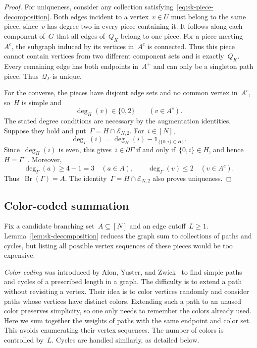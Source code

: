 \documentclass[letterpaper,11pt,reqno]{amsart}
\renewcommand{\leq}{\leqslant}
\renewcommand{\geq}{\geqslant}
\newcommand{\ind}{\mathds{1}}
\DeclareMathOperator{\Br}{Br}
\begin{document}
\begin{proof}
For uniqueness, consider any collection satisfying~\eqref{eq:sk-piece-decomposition}. Both edges incident to a vertex~$v\in U$ must belong to the same piece, since~$v$ has degree two in every piece containing it. It follows along each component of~$G$ that all edges of~$Q_K$ belong to one piece. For a piece meeting~$A^c$, the subgraph induced by its vertices in~$A^c$ is connected. Thus this piece cannot contain vertices from two different component sets and is exactly~$Q_K$. Every remaining edge has both endpoints in~$A^+$ and can only be a singleton path piece. Thus~$\mathcal Q_\Gamma$ is unique.

For the converse, the pieces have disjoint edge sets and no common vertex in~$A^c$, so~$H$ is simple and
\begin{equation*}
\deg_H(v)\in\{0,2\}\qquad(v\in A^c).
\end{equation*}
The stated degree conditions are necessary by the augmentation identities. Suppose they hold and put~$\Gamma=H\cap\mathcal E_{N,2}$. For~$i\in[N]$,
\begin{equation*}
\deg_\Gamma(i)=\deg_H(i)-\ind_{\{\{0,i\}\in H\}}.
\end{equation*}
Since~$\deg_H(i)$ is even, this gives~$i\in\partial\Gamma$ if and only if~$\{0,i\}\in H$, and hence~$H=\Gamma^+$. Moreover,
\begin{equation*}
\deg_\Gamma(a)\geq4-1=3\quad(a\in A),\qquad
\deg_\Gamma(v)\leq2\quad(v\in A^c).
\end{equation*}
Thus~$\Br(\Gamma)=A$. The identity~$\Gamma=H\cap\mathcal E_{N,2}$ also proves uniqueness.
\end{proof}



\subsection{Color-coded summation}\label{subsec:sk-colorful}

Fix a candidate branching set~$A\subseteq[N]$ and an edge cutoff~$L\geq1$. Lemma~\ref{lem:sk-decomposition} reduces the graph sum to collections of paths and cycles, but listing all possible vertex sequences of these pieces would be too expensive.

\emph{Color coding} was introduced by Alon, Yuster, and Zwick~\cite{AYZ95} to find simple paths and cycles of a prescribed length in a graph. The difficulty is to extend a path without revisiting a vertex. Their idea is to color vertices randomly and consider paths whose vertices have distinct colors. Extending such a path to an unused color preserves simplicity, so one only needs to remember the colors already used. Here we sum together the weights of paths with the same endpoint and color set. This avoids enumerating their vertex sequences. The number of colors is controlled by~$L$. Cycles are handled similarly, as detailed below.
\end{document}
